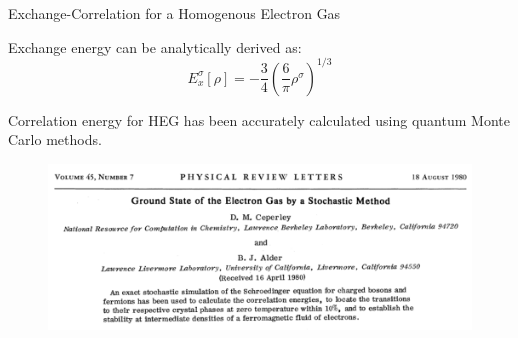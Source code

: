 \documentclass[aspectratio=169]{beamer}
\begin{document}
\begin{frame}{Exchange-Correlation for a Homogenous Electron Gas}

Exchange energy can be analytically derived as:
\begin{equation*}
    E_x^\sigma[\rho] = -\frac{3}{4}\left( \frac{6}{\pi} \rho^\sigma \right)^{1/3}
\end{equation*}

Correlation energy for HEG has been accurately calculated using quantum Monte Carlo methods.\cite{ceperleyGroundStateElectron1980}
\begin{figure}
    \centering
    \includegraphics[width=0.7\linewidth]{lectures/figures/5_LDA_Corre.png}
\end{figure}
\end{frame} 
\end{document}
